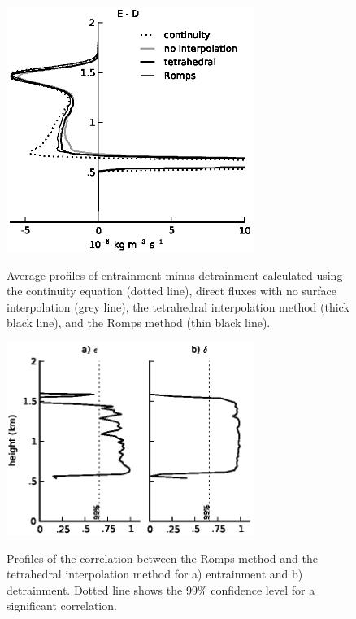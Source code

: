 \documentclass[12pt]{article}
\begin{document}
\begin{figure}[t]
  \noindent
  \includegraphics[width=19pc,angle=0]{./figures/E_minus_D}\\
  \caption{Average profiles of entrainment minus detrainment calculated using 
  the continuity equation (dotted line), direct fluxes with no surface 
  interpolation (grey line), the tetrahedral interpolation method
  (thick black line), and the Romps method (thin black line).
  }\label{fig:E_minus_D}
\end{figure}

\begin{figure}[t]
  \noindent
  \includegraphics[width=19pc,angle=0]{./figures/correlations}\\
  \caption{
  Profiles of the correlation between the Romps method and the
  tetrahedral interpolation method for a) entrainment and b) detrainment.  
  Dotted line shows the 99\% confidence level for a significant correlation.
  }
  \label{fig:correlations}
\end{figure}
\end{document}
